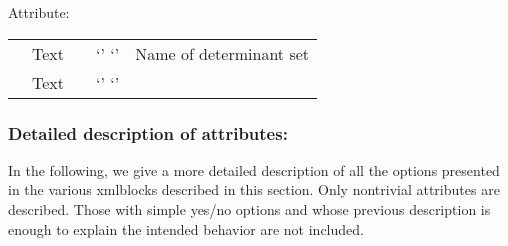 \documentclass[letterpaper,10pt,english]{sphinxmanual}
\begin{document}
Attribute:


\begin{savenotes}\sphinxattablestart
\centering
\begin{tabulary}{\linewidth}[t]{|T|T|T|T|T|}
\hline
\sphinxstyletheadfamily 
{}
&\sphinxstyletheadfamily 
{}
&\sphinxstyletheadfamily 
{}
&\sphinxstyletheadfamily 
{}
&\sphinxstyletheadfamily 
{}
\\
\hline
{}
&
Text
&
&
‘’ ‘’
&
Name of determinant set
\\
\hline&
Text
&
&
‘’ ‘’
&\\
\hline
\end{tabulary}
\par
\sphinxattableend\end{savenotes}


\subsubsection{Detailed description of attributes:}
\label{\detokenize{intro_wavefunction:detailed-description-of-attributes}}
In the following, we give a more detailed description of all the options presented in the various xml\sphinxhyphen{}blocks described in this section. Only nontrivial attributes are described. Those with simple yes/no options and whose previous description is enough to explain the intended behavior are not included.
\end{document}
